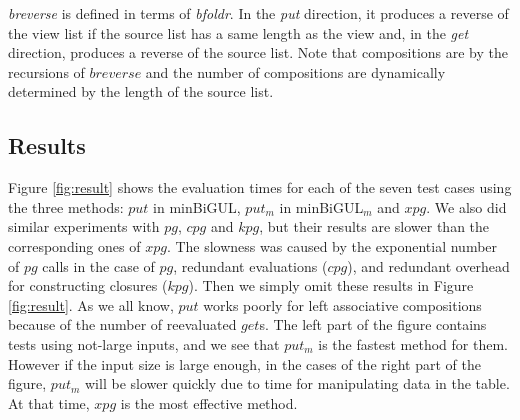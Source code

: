 \textit{breverse} is defined in terms of \textit{bfoldr}. In the \textit{put} direction, it produces a reverse of the view list if the source list has a same length as the view and, in the \textit{get} direction, produces a reverse of the source list. Note that compositions are by the recursions of $breverse$ and 
the number of compositions are dynamically determined by the length of the source list.

\subsection{Results}



Figure \ref{fig:result} 
shows the evaluation times for each of the seven test cases using the three methods: $put$ in minBiGUL, $put_m$ in minBiGUL$_m$ and $xpg$.
We also did similar experiments with $pg$, $cpg$ and $kpg$, but their results are slower than the corresponding ones of $xpg$. The slowness was caused by the exponential number of $pg$ calls in the case of $pg$, redundant evaluations ($cpg$), and redundant overhead for constructing closures ($kpg$).
Then we simply omit these results in Figure \ref{fig:result}.
As we all know, $put$ works poorly for left associative compositions because of the number of reevaluated $get$s.
The left part of the figure contains tests using not-large inputs, and we see that $put_m$ is the fastest method for them. However if the input size is large enough, in the cases of the right part of the figure, $put_m$ will be slower quickly due to time for manipulating data in the table. At that time, $xpg$ is 
the most effective method.
